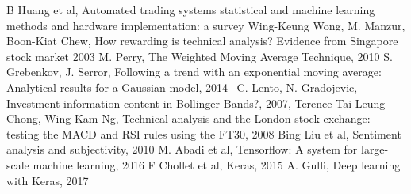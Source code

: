 \documentclass[11pt]{article} %
\begin{document}
\begin{thebibliography}{9}
B Huang et al, Automated trading systems statistical and machine learning methods and hardware implementation: a survey
Wing-Keung Wong, M. Manzur, Boon-Kiat Chew, How rewarding is technical analysis? Evidence from Singapore stock market 2003
M. Perry, The Weighted Moving Average Technique, 2010
S. Grebenkov, J. Serror, Following a trend with an exponential moving average: Analytical results for a Gaussian model, 2014\
C. Lento, N. Gradojevic, Investment information content in Bollinger Bands?, 2007, 
\bibitem{macd}
Terence Tai-Leung Chong, Wing-Kam Ng, Technical analysis and the London stock exchange: testing the MACD and RSI rules using the FT30, 2008
\bibitem{sentiment}
Bing Liu et al,  Sentiment analysis and subjectivity, 2010
M. Abadi et al, Tensorflow: A system for large-scale machine learning, 2016
\bibitem{keras}
F Chollet et al, Keras, 2015
A. Gulli,  Deep learning with Keras, 2017
\end{thebibliography}
\end{document}
